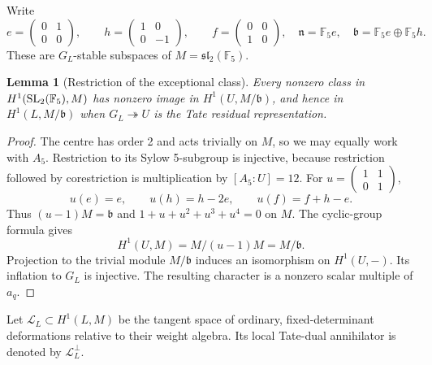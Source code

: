 \documentclass[11pt,a4paper]{article}
\newtheorem{lemma}[theorem]{Lemma}
\theoremstyle{definition}\newtheorem{definition}[theorem]{Definition}
\theoremstyle{remark}\newtheorem*{remark}{Remark}
\newcommand{\F}{\mathbb F}\newcommand{\OO}{\mathcal O}
\begin{document}
Write
\[
 e=\begin{pmatrix}0&1\\0&0\end{pmatrix},\qquad
 h=\begin{pmatrix}1&0\\0&-1\end{pmatrix},\qquad
 f=\begin{pmatrix}0&0\\1&0\end{pmatrix},
 \quad \mathfrak n=\F_5e,\quad\mathfrak b=\F_5e\oplus\F_5h.
\]
These are $G_L$-stable subspaces of $M=\mathfrak{sl}_2(\F_5)$.

\begin{lemma}[Restriction of the exceptional class]\label{lem:restriction}
Every nonzero class in $H^1(\SL_2(\F_5),M)$ has nonzero image in
$H^1(U,M/\mathfrak b)$, and hence in $H^1(L,M/\mathfrak b)$ when
$G_L\twoheadrightarrow U$ is the Tate residual representation.
\end{lemma}
\begin{proof}
The centre has order 2 and acts trivially on $M$, so we may equally work with
$A_5$. Restriction to its Sylow 5-subgroup is injective, because restriction
followed by corestriction is multiplication by $[A_5:U]=12$.
For $u=\left(\begin{smallmatrix}1&1\\0&1\end{smallmatrix}\right)$,
\[
 u(e)=e,\qquad u(h)=h-2e,\qquad u(f)=f+h-e.
\]
Thus $(u-1)M=\mathfrak b$ and $1+u+u^2+u^3+u^4=0$ on $M$.
The cyclic-group formula gives
\[
 H^1(U,M)=M/(u-1)M=M/\mathfrak b.
\]
Projection to the trivial module $M/\mathfrak b$ induces an isomorphism on
$H^1(U,-)$. Its inflation to $G_L$ is injective. The resulting character
is a nonzero scalar multiple of $a_q$.
\end{proof}

Let $\mathcal L_L\subset H^1(L,M)$ be the tangent space of ordinary,
fixed-determinant deformations relative to their weight algebra. Its local
Tate-dual annihilator is denoted by $\mathcal L_L^\perp$.
\end{document}
